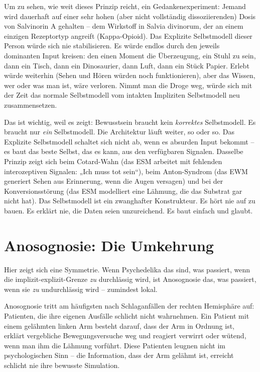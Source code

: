 \documentclass[11pt, twoside, openright]{book}
\begin{document}
Um zu sehen, wie weit dieses Prinzip reicht, ein Gedankenexperiment: Jemand wird dauerhaft auf einer sehr hohen (aber nicht vollständig dissoziierenden) Dosis von Salvinorin A gehalten -- dem Wirkstoff in Salvia divinorum, der an einem einzigen Rezeptortyp angreift (Kappa-Opioid). Das Explizite Selbstmodell dieser Person würde sich nie stabilisieren. Es würde endlos durch den jeweils dominanten Input kreisen: den einen Moment die Überzeugung, ein Stuhl zu sein, dann ein Tisch, dann ein Dinosaurier, dann Luft, dann ein Stück Papier. Erlebt würde weiterhin (Sehen und Hören würden noch funktionieren), aber das Wissen, wer oder was man ist, wäre verloren. Nimmt man die Droge weg, würde sich mit der Zeit das normale Selbstmodell vom intakten Impliziten Selbstmodell neu zusammensetzen.

Das ist wichtig, weil es zeigt: Bewusstsein braucht kein \textit{korrektes} Selbstmodell. Es braucht nur \textit{ein} Selbstmodell. Die Architektur läuft weiter, so oder so. Das Explizite Selbstmodell schaltet sich nicht ab, wenn es absurden Input bekommt -- es baut das beste Selbst, das es kann, aus den verfügbaren Signalen. Dasselbe Prinzip zeigt sich beim Cotard-Wahn (das ESM arbeitet mit fehlenden interozeptiven Signalen: „Ich muss tot sein“), beim Anton-Syndrom (das EWM generiert Sehen aus Erinnerung, wenn die Augen versagen) und bei der Konversionsstörung (das ESM modelliert eine Lähmung, die das Substrat gar nicht hat). Das Selbstmodell ist ein zwanghafter Konstrukteur. Es hört nie auf zu bauen. Es erklärt nie, die Daten seien unzureichend. Es baut einfach und glaubt.

\section*{Anosognosie: Die Umkehrung}

Hier zeigt sich eine Symmetrie. Wenn Psychedelika das sind, was passiert, wenn die implizit-explizit-Grenze \textit{zu} durchlässig wird, ist Anosognosie das, was passiert, wenn sie \textit{zu} undurchlässig wird -- zumindest lokal.

Anosognosie tritt am häufigsten nach Schlaganfällen der rechten Hemisphäre auf: Patienten, die ihre eigenen Ausfälle schlicht nicht wahrnehmen. Ein Patient mit einem gelähmten linken Arm besteht darauf, dass der Arm in Ordnung ist, erklärt vergebliche Bewegungsversuche weg und reagiert verwirrt oder wütend, wenn man ihm die Lähmung vorführt. Diese Patienten leugnen nicht im psychologischen Sinn -- die Information, dass der Arm gelähmt ist, erreicht schlicht nie ihre bewusste Simulation.
\end{document}
